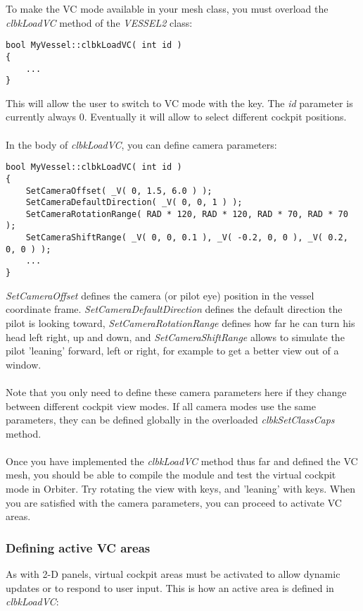 \documentclass[Orbiter Developer Manual.tex]{subfiles}
\begin{document}
\noindent
To make the VC mode available in your mesh class, you must overload the \textit{clbkLoadVC} method of the \textit{VESSEL2} class:

\begin{lstlisting}
bool MyVessel::clbkLoadVC( int id )
{
	...
}
\end{lstlisting}

\noindent
This will allow the user to switch to VC mode with the  key. The \textit{id} parameter is currently always 0. Eventually it will allow to select different cockpit positions.\\
\\
In the body of \textit{clbkLoadVC}, you can define camera parameters:

\begin{lstlisting}
bool MyVessel::clbkLoadVC( int id )
{
	SetCameraOffset( _V( 0, 1.5, 6.0 ) );
	SetCameraDefaultDirection( _V( 0, 0, 1 ) );
	SetCameraRotationRange( RAD * 120, RAD * 120, RAD * 70, RAD * 70 );
	SetCameraShiftRange( _V( 0, 0, 0.1 ), _V( -0.2, 0, 0 ), _V( 0.2, 0, 0 ) );
	...
}
\end{lstlisting}

\noindent
\textit{SetCameraOffset} defines the camera (or pilot eye) position in the vessel coordinate frame. \textit{SetCameraDefaultDirection} defines the default direction the pilot is looking toward, \textit{SetCameraRotationRange} defines how far he can turn his head left right, up and down, and \textit{SetCameraShiftRange} allows to simulate the pilot 'leaning' forward, left or right, for example to get a better view out of a window.\\
\\
Note that you only need to define these camera parameters here if they change between different cockpit view modes. If all camera modes use the same parameters, they can be defined globally in the overloaded \textit{clbkSetClassCaps} method.\\
\\
Once you have implemented the \textit{clbkLoadVC} method thus far and defined the VC mesh, you should be able to compile the module and test the virtual cockpit mode in Orbiter. Try rotating the view with \Alt\DArrow\UArrow\RArrow\LArrow keys, and 'leaning' with \Ctrl\Alt\DArrow\UArrow\RArrow\LArrow keys. When you are satisfied with the camera parameters, you can proceed to activate VC areas.


\subsubsection{Defining active VC areas}
As with 2-D panels, virtual cockpit areas must be activated to allow dynamic updates or to respond to user input. This is how an active area is defined in \textit{clbkLoadVC}:
\end{document}
